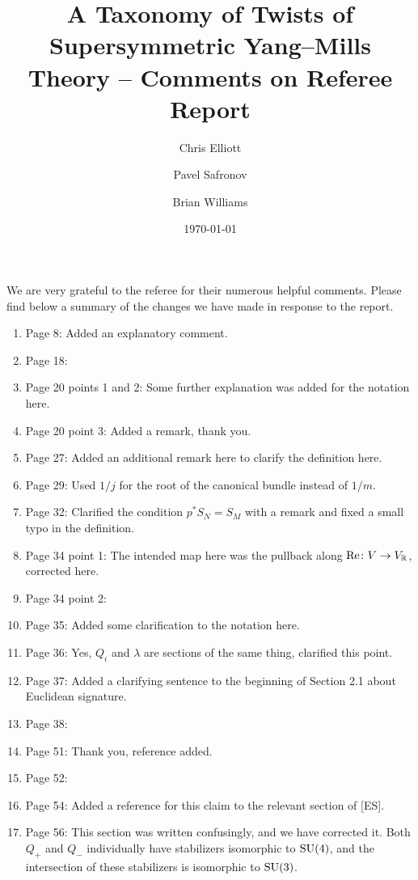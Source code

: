 \documentclass[10pt, oneside]{article}
\title{A Taxonomy of Twists of Supersymmetric Yang--Mills Theory -- Comments on Referee Report}
\author{Chris Elliott\and Pavel Safronov \and Brian Williams}
\date{\today}
\begin{document}
\maketitle

We are very grateful to the referee for their numerous helpful comments.  Please find below a summary of the changes we have made in response to the report.

\begin{enumerate}
 \item Page 8: Added an explanatory comment.
 \item Page 18:
 \item Page 20 points 1 and 2: Some further explanation was added for the notation here.
 \item Page 20 point 3: Added a remark, thank you.
 \item Page 27: Added an additional remark here to clarify the definition here.
 \item Page 29: Used $1/j$ for the root of the canonical bundle instead of $1/m$.
 \item Page 32: Clarified the condition $p^*S_N = S_M$ with a remark and fixed a small typo in the definition. 
 \item Page 34 point 1: The intended map here was the pullback along $\mathrm{Re} \colon V \to V_\mathbb R$, corrected here. 
 \item Page 34 point 2:
 \item Page 35: Added some clarification to the notation here.
 \item Page 36: Yes, $Q_i$ and $\lambda$ are sections of the same thing, clarified this point. 
 \item Page 37: Added a clarifying sentence to the beginning of Section 2.1 about Euclidean signature. 
 \item Page 38:
 \item Page 51: Thank you, reference added.
 \item Page 52:
 \item Page 54: Added a reference for this claim to the relevant section of [ES].
 \item Page 56: This section was written confusingly, and we have corrected it.  Both $Q_+$ and $Q_-$ individually have stabilizers isomorphic to $\mathrm{SU}(4)$, and the intersection of these stabilizers is isomorphic to $\mathrm{SU}(3)$.
\end{enumerate}

 
\end{document}
